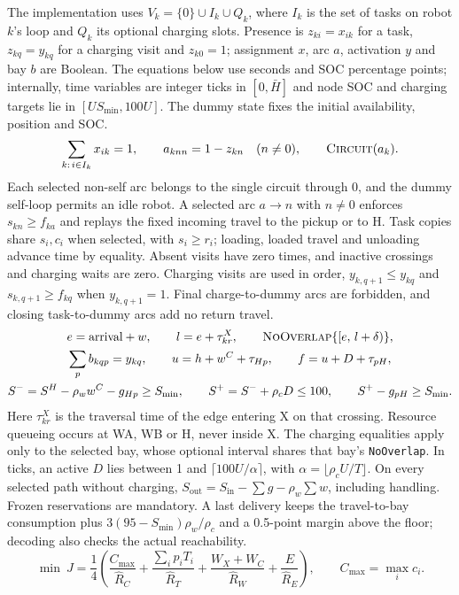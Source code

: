 \documentclass[11pt,a4paper]{article}
\newcommand{\code}[1]{\texttt{#1}}
\begin{document}
The implementation uses $V_k = \{0\} \cup I_k \cup Q_k$, where $I_k$ is the set of tasks on robot $k$'s
loop and $Q_k$ its optional charging slots. Presence is $z_{ki} = x_{ik}$ for a task,
$z_{kq} = y_{kq}$ for a charging visit and $z_{k0} = 1$; assignment $x$, arc $a$, activation $y$ and
bay $b$ are Boolean. The equations below use seconds and SOC percentage points; internally, time
variables are integer ticks in $[0, \bar H]$ and node SOC and charging targets lie in
$[U S_{\min}, 100U]$. The
dummy state fixes the initial availability, position and SOC.
\begin{equation}
\sum_{k:\, i \in I_k} x_{ik} = 1, \qquad a_{knn} = 1 - z_{kn} \quad (n \ne 0), \qquad
\textsc{Circuit}(a_k).
\end{equation}
Each selected non-self arc belongs to the single circuit through 0, and the dummy self-loop permits an
idle robot. A selected arc $a \to n$ with $n \ne 0$ enforces $s_{kn} \ge f_{ka}$ and replays the fixed incoming travel
to the pickup or to H. Task copies share $s_i, c_i$ when selected, with $s_i \ge r_i$; loading, loaded
travel and unloading advance time by equality. Absent visits have zero times, and inactive crossings
and charging waits are zero. Charging visits are used in order, $y_{k,q+1} \le y_{kq}$ and
$s_{k,q+1} \ge f_{kq}$ when $y_{k,q+1} = 1$. Final charge-to-dummy arcs are forbidden, and closing task-to-dummy arcs add no
return travel.
\begin{gather}
e = \text{arrival} + w, \qquad l = e + \tau^{X}_{kr}, \qquad \textsc{NoOverlap}\{[e,\, l + \delta)\}, \\
\sum_{p} b_{kqp} = y_{kq}, \qquad u = h + w^{C} + \tau_{Hp}, \qquad f = u + D + \tau_{pH}, \\
S^{-} = S^{H} - \rho_w w^{C} - g_{Hp} \ge S_{\min}, \qquad S^{+} = S^{-} + \rho_c D \le 100, \qquad
S^{+} - g_{pH} \ge S_{\min}.
\end{gather}
Here $\tau^{X}_{kr}$ is the traversal time of the edge entering X on that crossing. Resource queueing
occurs at WA, WB or H, never inside X. The charging equalities apply only to the selected bay,
whose optional interval shares that bay's \code{NoOverlap}. In ticks, an active $D$ lies between 1 and
$\lceil 100U/\alpha \rceil$, with $\alpha = \lfloor \rho_c U / T \rfloor$. On every selected path
without charging, $S_{\text{out}} = S_{\text{in}} - \sum g - \rho_w \sum w$, including handling.
Frozen reservations are mandatory. A last delivery keeps the travel-to-bay consumption plus
$3(95 - S_{\min})\rho_w/\rho_c$ and a 0.5-point margin above the floor; decoding also checks the actual
reachability.
\begin{equation}
\min\ J = \frac{1}{4}\left( \frac{C_{\max}}{\hat R_C} + \frac{\sum_i p_i T_i}{\hat R_T}
  + \frac{W_X + W_C}{\hat R_W} + \frac{E}{\hat R_E} \right), \qquad C_{\max} = \max_i c_i .
\end{equation}
\end{document}

